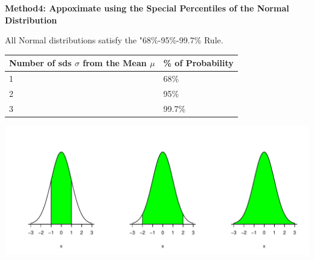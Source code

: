 \documentclass[t,xcolor=pdftex,dvipsnames,table]{beamer}
\makeatletter
\def\maxwidth{ %
  \ifdim\Gin@nat@width>\linewidth
    \linewidth
  \else
    \Gin@nat@width
  \fi
}
\newenvironment{knitrout}{}{} %
\makeatother
\begin{document}
\begin{frame}[fragile]\frametitle{}

{\bf Method4: Appoximate using the Special Percentiles of the Normal Distribution} 

All Normal distributions satisfy the "68\%-95\%-99.7\% Rule. \\

\vspace{.5cm}
\begin{tabular}{|l|l|} \hline
Number of sds $\sigma$ from the Mean $\mu$ & \% of Probability \\ \hline
1 & 68\%  \\
2 & 95\% \\
3 & 99.7\% \\ \hline
\end{tabular}


\begin{knitrout}
\color{fgcolor}
\includegraphics[width=\maxwidth]{figure/unnamed-chunk-20-1} 

\end{knitrout}

\end{frame}
\end{document}
